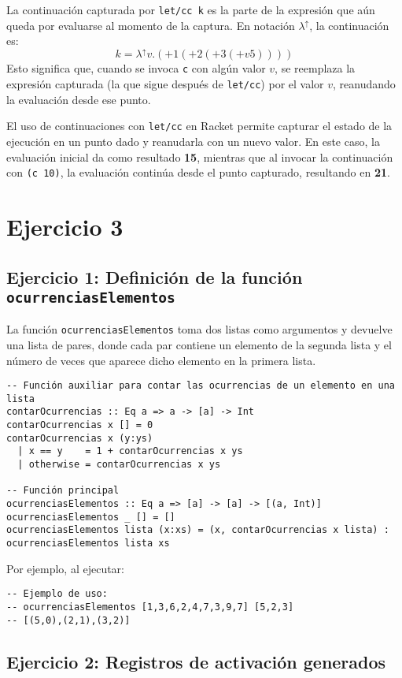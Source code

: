 \documentclass{article}
\begin{document}
La continuación capturada por \texttt{let/cc k} es la parte de la expresión que aún queda por evaluarse al momento de la captura. En notación \( \lambda^\uparrow \), la continuación es:
\[
k = \lambda^\uparrow v. (+ 1 (+ 2 (+ 3 (+ v 5))))
\]
Esto significa que, cuando se invoca \texttt{c} con algún valor \( v \), se reemplaza la expresión capturada (la que sigue después de \texttt{let/cc}) por el valor \( v \), reanudando la evaluación desde ese punto.

El uso de continuaciones con \texttt{let/cc} en Racket permite capturar el estado de la ejecución en un punto dado y reanudarla con un nuevo valor. En este caso, la evaluación inicial da como resultado \textbf{15}, mientras que al invocar la continuación con \texttt{(c 10)}, la evaluación continúa desde el punto capturado, resultando en \textbf{21}.

\section{Ejercicio 3}
\subsection{Ejercicio 1: Definición de la función \texttt{ocurrenciasElementos}}
La función \texttt{ocurrenciasElementos} toma dos listas como argumentos y devuelve una lista de pares, donde cada par contiene un elemento de la segunda lista y el número de veces que aparece dicho elemento en la primera lista.

\begin{lstlisting}
-- Función auxiliar para contar las ocurrencias de un elemento en una lista
contarOcurrencias :: Eq a => a -> [a] -> Int
contarOcurrencias x [] = 0
contarOcurrencias x (y:ys) 
  | x == y    = 1 + contarOcurrencias x ys
  | otherwise = contarOcurrencias x ys

-- Función principal
ocurrenciasElementos :: Eq a => [a] -> [a] -> [(a, Int)]
ocurrenciasElementos _ [] = []
ocurrenciasElementos lista (x:xs) = (x, contarOcurrencias x lista) : ocurrenciasElementos lista xs
\end{lstlisting}

Por ejemplo, al ejecutar:

\begin{lstlisting}
-- Ejemplo de uso:
-- ocurrenciasElementos [1,3,6,2,4,7,3,9,7] [5,2,3]
-- [(5,0),(2,1),(3,2)]
\end{lstlisting}

\subsection{Ejercicio 2: Registros de activación generados}
\end{document}
